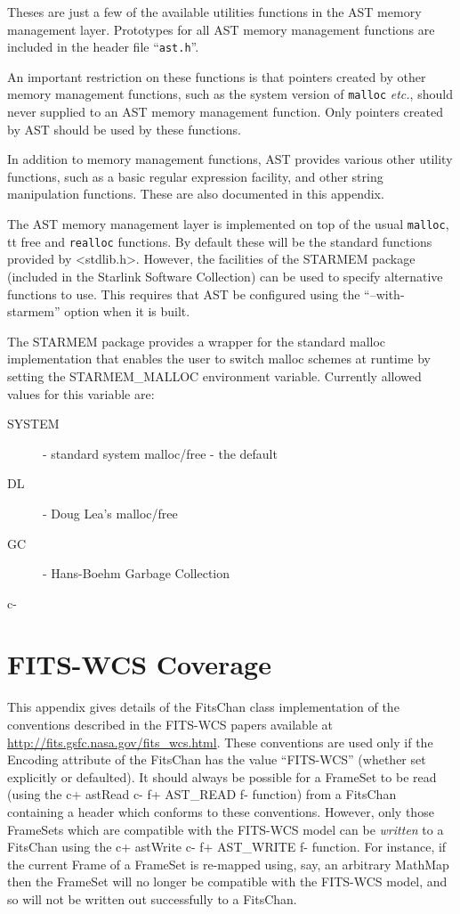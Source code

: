 \documentclass[twoside,11pt]{starlink}
\begin{document}
Theses are just a few of the available utilities functions in the AST
memory management layer. Prototypes for all AST memory management
functions are included in the header file ``\texttt{ast.h}''.

An important restriction on these functions is that pointers created by
other memory management functions, such as the system version of \texttt{malloc} \emph{etc.}, should never supplied to an AST memory management
function. Only pointers created by AST should be used by these functions.

In addition to memory management functions, AST provides various other
utility functions, such as a basic regular expression facility, and other
string manipulation functions. These are also documented in this appendix.

The AST memory management layer is implemented on top of the usual \texttt{malloc}, {tt free} and \texttt{realloc} functions. By default these will be
the standard functions provided by <stdlib.h>. However, the facilities of
the STARMEM package (included in the Starlink Software Collection) can be
used to specify alternative functions to use. This requires that AST be
configured using the ``--with-starmem'' option when it is built.

The STARMEM package provides a wrapper for the standard malloc
implementation that enables the user to switch malloc schemes at runtime
by setting the STARMEM\_MALLOC environment variable. Currently allowed
values for this variable are:

\begin{description}
\item [SYSTEM] - standard system malloc/free - the default
\item [DL] - Doug Lea's malloc/free
\item [GC] - Hans-Boehm Garbage Collection
\end{description}

\small

\normalsize
c-

\newpage
\section{\label{ss:fitswcscoverage}FITS-WCS Coverage}

This appendix gives details of the FitsChan class
implementation of the conventions described in the FITS-WCS papers
available at
\url{http://fits.gsfc.nasa.gov/fits_wcs.html}. These conventions are
used only if the Encoding attribute of the FitsChan
has the value ``FITS-WCS'' (whether set explicitly or defaulted). It
should always be possible for a FrameSet to be read
(using the
c+
astRead
c-
f+
AST\_READ
f-
function) from a FitsChan containing a header which conforms to these
conventions. However, only those FrameSets which are compatible with the
FITS-WCS model can be \emph{written} to a FitsChan using the
c+
astWrite
c-
f+
AST\_WRITE
f-
function. For instance, if the current Frame of a
FrameSet is re-mapped using, say, an arbitrary MathMap
then the FrameSet will no longer be compatible with the FITS-WCS model,
and so will not be written out successfully to a FitsChan.
\end{document}
